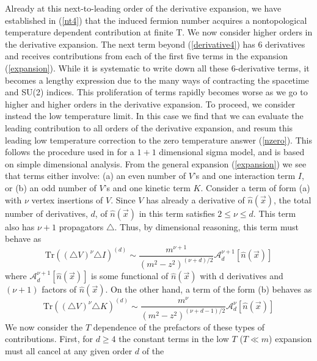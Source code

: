 \documentclass[a4paper,prd]{revtex4}
\begin{document}
Already at this next-to-leading order of the derivative expansion, we
have established in (\ref{nt4}) that the induced fermion number acquires
a nontopological temperature dependent contribution at finite T. We now
consider higher orders in the derivative expansion. The next term beyond
(\ref{derivative4}) has 6 derivatives and receives contributions from
each of the first five terms in the expansion (\ref{expansion}). While
it is systematic to write down all these 6-derivative terms, it
becomes a lengthy expression due to the many ways of contracting the
spacetime and SU(2) indices. This proliferation of terms
rapidly becomes worse as we go to higher and higher orders in the
derivative expansion. To proceed, we consider instead the low temperature
limit. In this case we find that we can evaluate the leading contribution
to all orders of the derivative expansion, and resum this leading low
temperature correction to the zero temperature answer (\ref{nzero}).
This follows the procedure used in \cite{ad} for a $1+1$ dimensional
sigma model, and is based on simple dimensional analysis.  From the
general expansion (\ref{expansion}) we see that terms either involve:
(a) an even number of $ V$'s and one interaction term $I$, or (b) an odd
number of $V$'s and one kinetic term $K$. Consider a term of form (a) with
$\nu$ vertex insertions of $V$. Since $V$ has already a derivative of
$\hat{n}(\vec{x})$, the total number of derivatives, $d$, of
$\hat{n}(\vec{x})$ in this term satisfies $2\le \nu
\le d$. This term also has
$\nu +1$ propagators $\triangle$. Thus, by dimensional reasoning, this term must
behave as
\begin{equation}
\textrm{Tr}((\triangle V)^{\nu}\triangle I)^{(d)}\sim 
\frac{m^{\nu +1}}{(m^{2}-z^{2})^{(\nu +d)/2}} \mathcal{A}_{d}^{\nu
+1}[\hat{n}(\vec{x})]
\label{dimensiona}
\end{equation}
where $\mathcal{A}_{d}^{\nu +1}[\hat{n}(\vec{x})]$ is some functional of 
$\hat{n}(\vec{x})$ with d derivatives and $(\nu +1)$ factors of 
$\hat{n}(\vec{x})$.
On the other hand,  a term of the form (b) behaves as 
\begin{equation}
\textrm{Tr}((\triangle V)^{\nu}\triangle K)^{(d)}\sim 
\frac{m^{\nu}}{(m^{2}-z^{2})^{(\nu +d -1)/2}} \mathcal{A}_{d}^{\nu }[\hat{n}(\vec{x})]
\label{dimensionb}
\end{equation}
We now consider the $T$ dependence of the prefactors of these types of 
contributions. First, for $d\geq 4$ the constant terms in the low $T$
($T\ll m$) expansion  must all cancel at any given order $d$ of the
\end{document}
